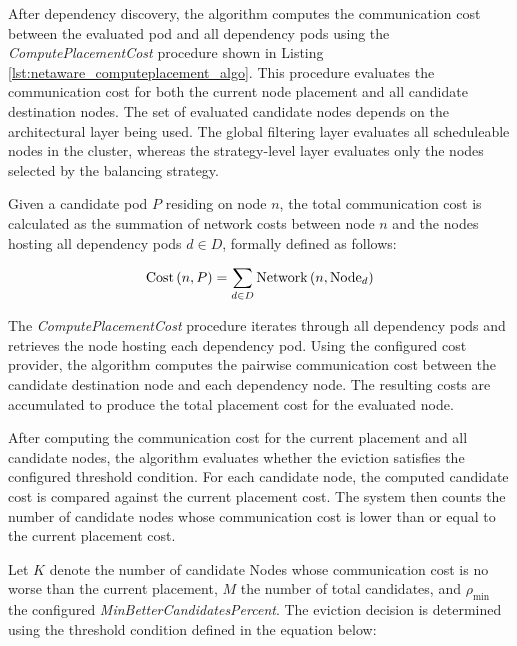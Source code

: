 After dependency discovery, the algorithm computes the communication cost between the evaluated pod and all dependency pods using the \textit{ComputePlacementCost} procedure shown in Listing \ref{lst:netaware_computeplacement_algo}. This procedure evaluates the communication cost for both the current node placement and all candidate destination nodes. The set of evaluated candidate nodes depends on the architectural layer being used. The global filtering layer evaluates all scheduleable nodes in the cluster, whereas the strategy-level layer evaluates only the nodes selected by the balancing strategy.

\begin{figure}[tbp]
    \centering
    \begin{minipage}{0.95\textwidth}
    
    \end{minipage}
\end{figure}

Given a candidate pod $P$ residing on node $n$, the total communication cost is calculated as the summation of network costs between node $n$ and the nodes hosting all dependency pods $d \in D$, formally defined as follows:

\[
\text{Cost}\left(n, P\right) = \sum_{d \in D} \text{Network}\left(n, \text{Node}_{d}\right)
\]

The \textit{ComputePlacementCost} procedure iterates through all dependency pods and retrieves the node hosting each dependency pod. Using the configured cost provider, the algorithm computes the pairwise communication cost between the candidate destination node and each dependency node. The resulting costs are accumulated to produce the total placement cost for the evaluated node.

After computing the communication cost for the current placement and all candidate nodes, the algorithm evaluates whether the eviction satisfies the configured threshold condition. For each candidate node, the computed candidate cost is compared against the current placement cost. The system then counts the number of candidate nodes whose communication cost is lower than or equal to the current placement cost.

Let \(K\) denote the number of candidate Nodes whose communication cost is no worse than the current placement, \(M\) the number of total candidates, and \(\rho_{\min}\) the configured \textit{MinBetterCandidatesPercent}. The eviction decision is determined using the threshold condition defined in the equation below:

